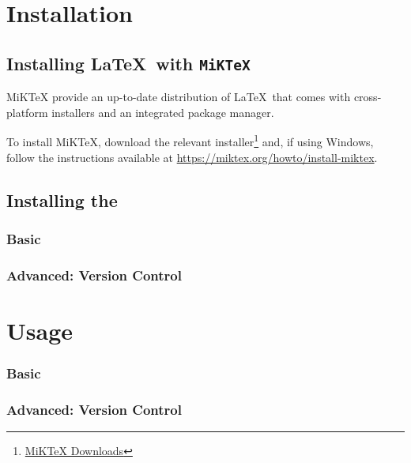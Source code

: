 \section{Installation}
\subsection{Installing \LaTeX\ with \texttt{MiKTeX}}
MiKTeX provide an up-to-date distribution of \LaTeX\ that comes with cross-platform installers and an integrated package manager.

To install MiKTeX, download the relevant installer\footnote{\href{https://miktex.org/download}{MiKTeX Downloads}} and, if using Windows, follow the instructions available at \href{https://miktex.org/howto/install-miktex}{https://miktex.org/howto/install-miktex}.

\subsection{Installing the \uswdwmspkg{}}
\subsubsection*{Basic}
\subsubsection*{Advanced: Version Control}

\pagebreak
\section{Usage}
\subsubsection*{Basic}
\subsubsection*{Advanced: Version Control}

